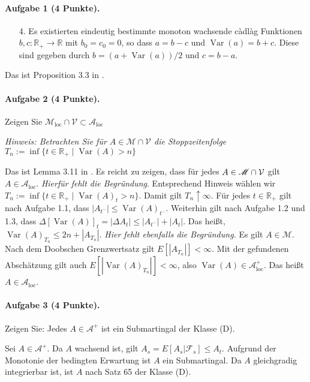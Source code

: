 \documentclass{article}
\begin{document}
\paragraph{Aufgabe 1 \textnormal{(4 Punkte)}.}
\begin{itemize}
\item [4.] Es existierten eindeutig bestimmte monoton wachsende càdlàg Funktionen $b,c\colon\mathbb{R}_+\to\mathbb{R}$ mit $b_0=c_0=0$, so dass $a=b-c$ und $\operatorname{Var}(a)=b+c$.
  Diese sind gegeben durch $b=(a+\operatorname{Var}(a))/2$ und $c=b-a$.
\end{itemize}
Das ist Proposition 3.3 in \cite{jacod2013limit}.

\paragraph{Aufgabe 2 \textnormal{(4 Punkte)}.}
Zeigen Sie $\mathscr{M}_{\text{loc}}\cap\mathcal{V}\subset\mathscr{A}_{\text{loc}}$

\noindent\emph{Hinweis: Betrachten Sie für $A\in\mathscr{M}\cap\mathcal{V}$ die Stoppzeitenfolge $T_n:=\inf\{t\in\mathbb{R}_+\mid\operatorname{Var}(A)>n\}$}

Das ist Lemma 3.11 in \cite{jacod2013limit}.
Es reicht zu zeigen, dass für jedes $A\in\mathscr{M}\cap{\cal V}$ gilt $A\in\mathscr{A}_{\text{loc}}$.
\emph{Hierfür fehlt die Begründung}.
Entsprechend Hinweis wählen wir $T_n:=\inf\{t\in\mathbb{R}_+\mid\operatorname{Var}(A)_t>n\}$.
Damit gilt $T_n\uparrow\infty$.
Für jedes $t\in\mathbb{R}_+$ gilt nach Aufgabe 1.1, dass $|A_{t^-}|\leq\operatorname{Var}(A)_{t^-}$.
Weiterhin gilt nach Aufgabe 1.2 und 1.3, dass $\Delta[\operatorname{Var}(A)]_t=|\Delta A_t|\leq|A_{t^-}|+|A_t|$.
Das heißt, $\operatorname{Var}(A)_{T_n}\leq 2n+|A_{T_n}|$.
\emph{Hier fehlt ebenfalls die Begründung.}
Es gilt $A\in\mathscr{M}$.
Nach dem Doobschen Grenzwertsatz gilt $E[|A_{T_n}|]<\infty$.
Mit der gefundenen Abschätzung gilt auch $E[|\operatorname{Var}(A)_{T_n}|]<\infty$, also $\operatorname{Var}(A)\in\mathscr{A}_{\text{loc}}^+$.
Das heißt $A\in\mathscr{A}_{\text{loc}}$.

\paragraph{Aufgabe 3 \textnormal{(4 Punkte)}.}
Zeigen Sie: Jedes $A\in\mathscr{A}^+$ ist ein Submartingal der Klasse (D).

Sei $A\in\mathscr{A}^+$.
Da $A$ wachsend ist, gilt $A_s=E[A_s|\mathscr{F}_s]\leq A_t$.
Aufgrund der Monotonie der bedingten Erwartung ist $A$ ein Submartingal.
Da $A$ gleichgradig integrierbar ist, ist $A$ nach Satz 65 der Klasse (D).
\end{document}
